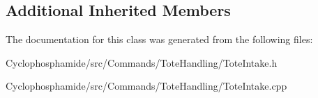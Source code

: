 \subsection*{Additional Inherited Members}


The documentation for this class was generated from the following files\+:\begin{DoxyCompactItemize}
\item 
Cyclophosphamide/src/\+Commands/\+Tote\+Handling/Tote\+Intake.\+h\item 
Cyclophosphamide/src/\+Commands/\+Tote\+Handling/Tote\+Intake.\+cpp\end{DoxyCompactItemize}
